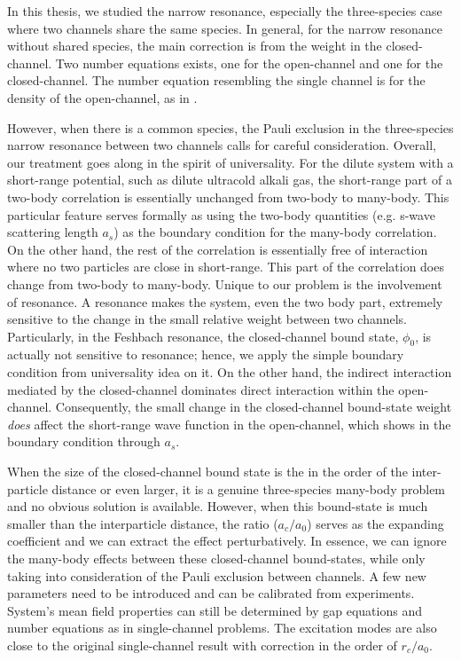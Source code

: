 % 
In this thesis, we studied the narrow resonance, especially the three-species case where two channels share the same species.  In general, for the narrow resonance without shared species, the main correction is from the weight in the closed-channel.  Two number equations exists, one for the open-channel and one for the closed-channel.  The number equation resembling the single channel is for the density of the open-channel, as in  \cite{GurarieNarrow}.  

However, when there is a common species,  the Pauli exclusion in the three-species narrow resonance between two channels calls for careful  consideration.  Overall, our treatment goes along in the spirit of universality.  For the dilute system with a short-range potential, such as dilute ultracold alkali gas, the short-range part of a two-body correlation is essentially unchanged from two-body  to many-body.  This particular feature serves formally as using the two-body quantities (e.g. s-wave scattering length $a_{s}$) as the boundary condition for the many-body correlation.  On the other hand, the rest of the correlation is essentially free of interaction where no two particles are close in short-range. This part of the correlation does change from two-body to many-body.  Unique to our problem is the involvement of resonance.  A resonance makes the system, even the two body part, extremely sensitive to the change in the small relative weight between two channels. Particularly, in the Feshbach resonance, the closed-channel bound state, $\phi_{0}$,  is actually not sensitive to resonance; hence, we apply the simple boundary condition from universality idea on it. On the other hand, the indirect interaction mediated by the closed-channel dominates direct interaction within the open-channel. Consequently, the small change in the closed-channel bound-state weight \emph{does} affect the short-range wave function in the open-channel, which shows in the boundary condition through $a_{s}$. 

When the size of  the closed-channel bound state is the in the order of the   inter-particle distance or even larger, it is a genuine three-species many-body problem and no obvious solution is available.  However, when this bound-state is much smaller than the interparticle distance, the ratio ($a_{c}/a_{0}$) serves as the expanding coefficient and we can extract  the effect perturbatively.  In essence, we can ignore the many-body effects between these closed-channel bound-states, while only taking into consideration of the Pauli exclusion between channels.  A few new parameters need to be introduced and can be calibrated from experiments.  System's mean field properties can still be determined by gap equations and number equations as in single-channel problems.  The excitation modes are also close to the original single-channel result with correction in the order of $r_{c}/a_{0}$.


